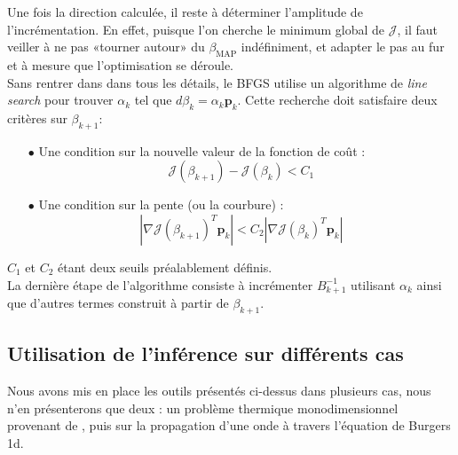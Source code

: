 \documentclass[a4paper,12pt]{article}
\newcommand{\bepar}[1]{
	\left( #1 \right)  
}
\newcommand{\bmap}{\beta_{\text{MAP}}}
\newcommand{\J}{\mathcal{J}}
\newcommand\bk{\color{black}}
\newcommand\brick{\color{brick}}
\numberwithin{equation}{section} %
\begin{document}
\noindent Une fois la direction calculée, il reste à déterminer l'amplitude de l'incrémentation. En effet, puisque l'on cherche le minimum global de $\J$, il faut veiller à ne pas «tourner autour» du $\bmap$ indéfiniment, et adapter le pas au fur et à mesure que l'optimisation se déroule.\\ 
Sans rentrer dans dans tous les détails, le BFGS utilise un algorithme de \textit{line search} pour trouver $ \displaystyle \alpha_k$ tel que $d\beta_k = \alpha_k\mathbf{p}_k$. Cette recherche doit satisfaire deux critères sur $\beta_{k+1}$: 
\begin{itemize}
\item[$\bullet$] Une condition sur la nouvelle valeur de la fonction de coût : \begin{equation}
\J\bepar{\beta_{k+1}} - \J\bepar{\beta_k} < C_1
\end{equation} 

\item[$\bullet$] Une condition sur la pente (ou la courbure) : 
\begin{equation}
|\nabla\J \bepar{\beta_{k+1}}^T\textbf{p}_k| < C_2 |\nabla\J \bepar{\beta_k}^T\textbf{p}_k|
\end{equation}
\end{itemize} 
$C_1$ et $C_2$ étant deux seuils préalablement définis.\\
La dernière étape de l'algorithme consiste à incrémenter $B_{k+1}^{-1}$ utilisant $\alpha_k$ ainsi que d'autres termes construit à partir de $\beta_{k+1}$.\\

\pagebreak

\brick \subsection{Utilisation de l'inférence sur différents cas} \bk

Nous avons mis en place les outils présentés ci-dessus dans plusieurs cas, nous n'en présenterons que deux : un problème thermique monodimensionnel provenant de \citep{parish2016paradigm}, puis sur la propagation d'une onde à travers l'équation de Burgers 1d.
\end{document}
